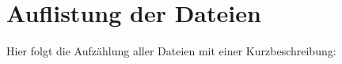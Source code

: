 \section{Auflistung der Dateien}
Hier folgt die Aufzählung aller Dateien mit einer Kurzbeschreibung\+:\begin{DoxyCompactList}
\item{}
\end{DoxyCompactList}
